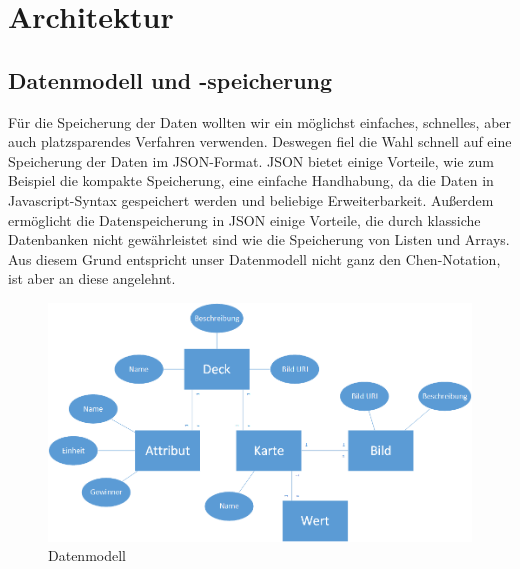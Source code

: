 \section{Architektur}
\label{sec:implementierung:architektur}

\subsection{Datenmodell und -speicherung}
\label{sec:implementierung:architektur:datenmodell }

Für die Speicherung der Daten wollten wir ein möglichst einfaches, schnelles, aber auch platzsparendes Verfahren verwenden. Deswegen fiel die Wahl schnell auf eine Speicherung der Daten im JSON-Format. JSON bietet einige Vorteile, wie zum Beispiel die kompakte Speicherung, eine einfache Handhabung, da die Daten in Javascript-Syntax gespeichert werden und beliebige Erweiterbarkeit. Außerdem ermöglicht die Datenspeicherung in JSON einige Vorteile, die durch klassiche Datenbanken nicht gewährleistet sind wie die Speicherung von Listen und Arrays. Aus diesem Grund entspricht unser Datenmodell nicht ganz den Chen-Notation, ist aber an diese angelehnt.\\

\begin{figure}[htp]
	\centering
  	\includegraphics[width=\textwidth]{img/modelle/Datenmodell_aktualisiert.png}
	\caption{Datenmodell}
	\label{figure:implementierungdatenmodell}
\end{figure}

